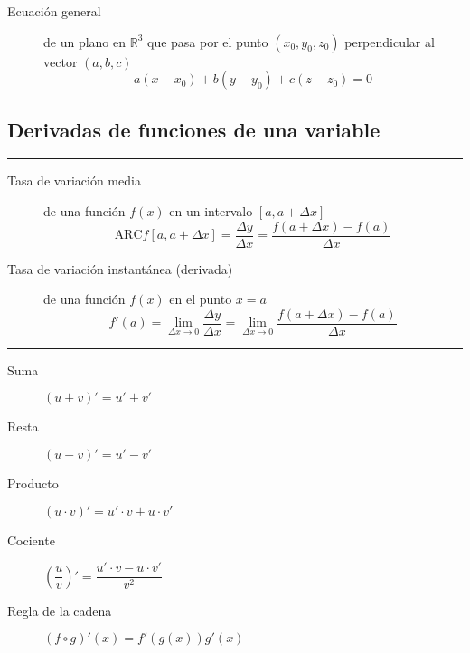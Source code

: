 \begin{multicols}{2}
	\begin{tcolorbox}[hbox, title=Planos]
		\begin{minipage}{0.4\textwidth}
			\begin{description}
				\item[Ecuación general] de un plano en $\mathbb{R}^3$ que pasa por el punto $(x_0,y_0,z_0)$ perpendicular al vector $(a,b,c)$
				      \[
					      a(x-x_0)+b(y-y_0)+c(z-z_0)=0
				      \]
			\end{description}
		\end{minipage}
	\end{tcolorbox}


\subsection*{Derivadas de funciones de una variable}

	\begin{tcolorbox}[hbox, title=Concepto de derivada]
		\begin{minipage}{0.4\textwidth}
			\flushleft
			\rule{0.4\textwidth}{0pt}
			\begin{description}
				\item[Tasa de variación media] de una función $f(x)$ en un intervalo $[a,a+\Delta x]$
				      \[
					      \mbox{ARC}f[a,a+\Delta x] = \frac{\Delta y}{\Delta x} = \frac{f(a+\Delta x)-f(a)}{\Delta x}
				      \]
				\item[Tasa de variación instantánea (derivada)] de una función $f(x)$ en el punto $x=a$
				      \[
					      f'(a)=\lim_{\Delta x\rightarrow 0} \frac{\Delta y}{\Delta x} = \lim_{\Delta x\rightarrow 0}\frac{f(a+\Delta x)-f(a)}{\Delta x}
				      \]
			\end{description}
		\end{minipage}
	\end{tcolorbox}

	\begin{tcolorbox}[hbox, title=Álgebra de derivadas]
		\begin{minipage}{0.4\textwidth}
			\flushleft
			\rule{0.4\textwidth}{0pt}
			\begin{description}
				\item[Suma] $(u+v)'=u'+v'$
				\item[Resta] $(u-v)'=u'-v'$
				\item[Producto] $(u\cdot v)'=u'\cdot v+ u\cdot v'$
				\item[Cociente] $\left(\dfrac{u}{v}\right)'=\dfrac{u'\cdot v-u\cdot v'}{v^2}$
				\item[Regla de la cadena] $(f\circ g)'(x)=f'(g(x))g'(x)$
			\end{description}
		\end{minipage}
	\end{tcolorbox}


\end{multicols}
